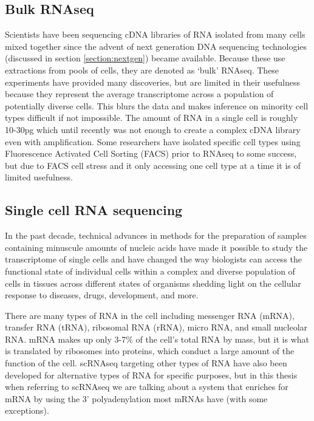 \subsection{Bulk RNAseq}
\par{
Scientists have been sequencing cDNA libraries of RNA isolated from many cells mixed together since the advent of next generation DNA sequencing technologies (discussed in section \ref{section:nextgen}) became available\cite{RNAseq1}\cite{RNAseq2}. Because these use extractions from pools of cells, they are denoted as `bulk' RNAseq. These experiments have provided many discoveries, but are limited in their usefulness because they represent the average transcriptome across a population of potentially diverse cells. This blurs the data and makes inference on minority cell types difficult if not impossible. The amount of RNA in a single cell is roughly 10-30pg\cite{howmuchrna} which until recently was not enough to create a complex cDNA library even with amplification. Some researchers have isolated specific cell types using Fluorescence Activated Cell Sorting (FACS)\cite{FACspatent}\cite{FACs} prior to RNAseq to some success\cite{FACszebra}, but due to FACS cell stress and it only accessing one cell type at a time it is of limited usefulness.
}

\subsection{Single cell RNA sequencing}

\par{
In the past decade, technical advances in methods for the preparation of samples containing minuscule amounts of nucleic acids have made it possible to study the transcriptome of single cells\cite{first_singlecell} and have changed the way biologists can access the functional state of individual cells within a complex and diverse population of cells in tissues across different states of organisms shedding light on the cellular response to diseases, drugs, development, and more.
} 
\par{
There are many types of RNA in the cell including messenger RNA (mRNA), transfer RNA (tRNA), ribosomal RNA (rRNA), micro RNA, and small nucleolar RNA. mRNA makes up only 3-7\% of the cell's total RNA by mass\cite{rnacontent}, but it is what is translated by ribosomes into proteins, which conduct a large amount of the function of the cell. scRNAseq targeting other types of RNA have also been developed for alternative types of RNA for specific purposes\cite{nonmRNASC}, but in this thesis when referring to scRNAseq we are talking about a system that enriches for mRNA by using the 3' polyadenylation most mRNAs have (with some exceptions\cite{nonpoly}).
}

